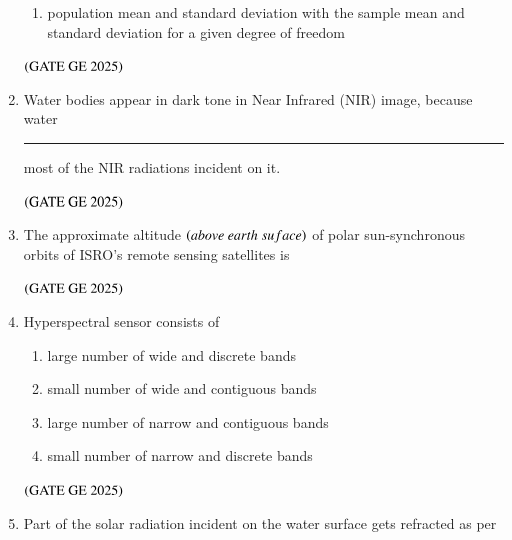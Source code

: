 \documentclass[journal,12pt,onecolumn]{IEEEtran}
\theoremstyle{remark}
\begin{document}
\begin{enumerate}
\begin{enumerate}
\item population mean and standard deviation with the sample mean 
and standard deviation for a given degree of freedom
\end{enumerate}
\hfill $\left(\text{GATE GE 2025}\right)$
\bigskip
\item Water bodies appear in dark tone in Near Infrared (NIR) image, because water \rule{2cm}{0.5mm} most of the NIR radiations incident on it.
\begin{enumerate}
\end{enumerate}
\hfill $\left(\text{GATE GE 2025}\right)$
\bigskip
\item The approximate altitude $\brak{above\ earth\ suface}$ of polar sun-synchronous orbits of ISRO's remote sensing satellites is
\begin{enumerate}
\end{enumerate}
\hfill $\left(\text{GATE GE 2025}\right)$
\bigskip
\item Hyperspectral sensor consists of
\begin{enumerate}
\item large number of wide and discrete bands
\item small number of wide and contiguous bands
\item large number of narrow and contiguous bands
\item small number of narrow and discrete bands
\end{enumerate}
\hfill $\left(\text{GATE GE 2025}\right)$
\bigskip
\item Part of the solar radiation incident on the water surface gets refracted as per
\begin{enumerate}
\end{enumerate}
\end{enumerate}
\end{document}
